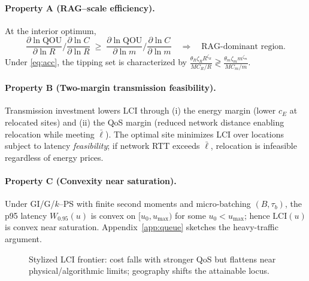 \documentclass[12pt]{article}
\numberwithin{equation}{section}
\theoremstyle{definition}
\theoremstyle{plain}
\newcommand{\QOU}{\mathrm{QOU}}
\newcommand{\LCI}{\mathrm{LCI}}
\begin{document}
\paragraph{Property A (RAG–scale efficiency).}
At the interior optimum,
\[
\frac{\partial \ln \QOU}{\partial \ln R}\Big/\frac{\partial \ln C}{\partial \ln R}
\;\ge\;
\frac{\partial \ln \QOU}{\partial \ln m}\Big/\frac{\partial \ln C}{\partial \ln m}
\quad\Rightarrow\quad
\text{RAG-dominant region.}
\]
Under \eqref{eq:acc}, the tipping set is characterized by $\tfrac{\theta_R\zeta_R R^{\zeta_R}}{MC_R/R}\gtrless \tfrac{\theta_m\zeta_m m^{\zeta_m}}{MC_m/m}$.

\paragraph{Property B (Two-margin transmission feasibility).}
Transmission investment lowers LCI through (i) the energy margin (lower $c_E$ at relocated sites) and (ii) the QoS margin (reduced network distance enabling relocation while meeting $\bar\ell$). The optimal site minimizes LCI over locations subject to latency \emph{feasibility}; if network RTT exceeds $\bar\ell$, relocation is infeasible regardless of energy prices.

\paragraph{Property C (Convexity near saturation).}
Under GI/G/$k$–PS with finite second moments and micro-batching $(B,\tau_b)$, the p95 latency $W_{0.95}(u)$ is convex on $[u_0,u_{\max})$ for some $u_0<u_{\max}$; hence $\LCI(u)$ is convex near saturation. Appendix~\ref{app:queue} sketches the heavy-traffic argument.

\begin{figure}[t]
\centering
{}
\caption{Stylized LCI frontier: cost falls with stronger QoS but flattens near physical/algorithmic limits; geography shifts the attainable locus.}
\label{fig:frontier}
\end{figure}
\end{document}

